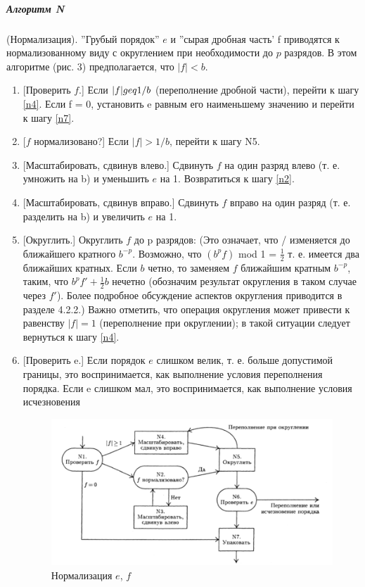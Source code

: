 \subparagraph{Алгоритм N} (Нормализация). ''Грубый порядок'' $e$ и ''сырая дробная часть' f приводятся к нормализованному виду с округлением при необходимости до $p$ разрядов. В этом алгоритме (рис. 3) предполагается, что $|f| < b$.

\begin{enumerate}[label=N{\arabic*}]
\item\label{n1} [Проверить $f$.] Если $|f| \\geq 1/b$ (переполнение дробной части), перейти к шагу \ref{n4}. Если f = 0, установить e равным его наименьшему значению и перейти к шагу \ref{n7}.

\item\label{n2} [$f$ нормализовано?] Если $|f| > 1/b$, перейти к шагу N5.

\item\label{n3} [Масштабировать, сдвинув влево.] Сдвинуть $f$ на один разряд влево (т. е. умножить на b) и уменьшить $e$ на 1. Возвратиться к шагу \ref{n2}.

\item\label{n4} [Масштабировать, сдвинув вправо.] Сдвинуть $f$ вправо на один разряд (т. е. разделить на b) и увеличить $e$ на 1.

\item\label{n5} [Округлить.] Округлить $f$ до p разрядов: (Это означает, что / изменяется до ближайшего кратного $b^{-p}$. Возможно, что $(b^{p}f)$ mod 1 = $\frac{1}{2}$ т. е. имеется два ближайших кратных. Если $b$ четно, то заменяем $f$ ближайшим кратным $b^{-p}$, таким, что $b^{p}f' + \frac{1}{2}b$ нечетно (обозначим результат округления в таком случае через $f'$). Более подробное обсуждение аспектов округления приводится в разделе 4.2.2.) Важно отметить, что операция округления может привести к равенству $|f| = 1$ (переполнение при округлении); в такой ситуации следует вернуться к шагу \ref{n4}.

\item\label{n6} [Проверить e.] Если порядок $e$ слишком велик, т. е. больше допустимой границы, это воспринимается, как выполнение условия переполнения порядка. Если e слишком мал, это воспринимается, как выполнение условия исчезновения 
 
\begin{figure}

\begin{center}
\includegraphics[scale=.6]{s2}
\end{center}
\caption{Нормализация $e$, $f$}
\end{figure}


\end{enumerate}
